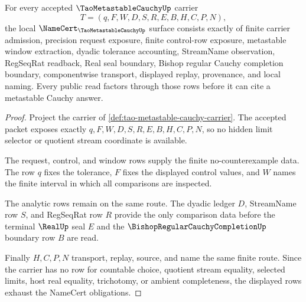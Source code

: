 \begin{theorem}\label{thm:tao-metastable-cauchy-namecert-obligations}
For every accepted $\TaoMetastableCauchyUp$ carrier
$$
T=(q,F,W,D,S,R,E,B,H,C,P,N),
$$
the local $\NameCert_{\TaoMetastableCauchyUp}$ surface consists exactly of finite carrier admission, precision request exposure, finite control-row exposure, metastable window extraction, dyadic tolerance accounting, StreamName observation, RegSeqRat readback, Real seal boundary, Bishop regular Cauchy completion boundary, componentwise transport, displayed replay, provenance, and local naming. Every public read factors through those rows before it can cite a metastable Cauchy answer.
\end{theorem}
\begin{proof}
Project the carrier of \autoref{def:tao-metastable-cauchy-carrier}. The accepted packet exposes exactly $q,F,W,D,S,R,E,B,H,C,P,N$, so no hidden limit selector or quotient stream coordinate is available.

The request, control, and window rows supply the finite no-counterexample data. The row $q$ fixes the tolerance, $F$ fixes the displayed control values, and $W$ names the finite interval in which all comparisons are inspected.

The analytic rows remain on the same route. The dyadic ledger $D$, StreamName row $S$, and RegSeqRat row $R$ provide the only comparison data before the terminal $\RealUp$ seal $E$ and the $\BishopRegularCauchyCompletionUp$ boundary row $B$ are read.

Finally $H,C,P,N$ transport, replay, source, and name the same finite route. Since the carrier has no row for countable choice, quotient stream equality, selected limits, host real equality, trichotomy, or ambient completeness, the displayed rows exhaust the NameCert obligations.
\end{proof}

